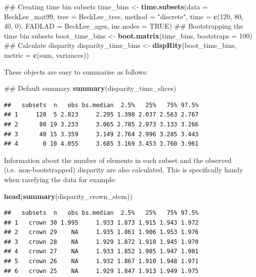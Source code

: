 \documentclass[]{book}
\newenvironment{Shaded}{\begin{snugshade}}{\end{snugshade}}
\newcommand{\KeywordTok}[1]{\textcolor[rgb]{0.13,0.29,0.53}{\textbf{#1}}}
\newcommand{\DataTypeTok}[1]{\textcolor[rgb]{0.13,0.29,0.53}{#1}}
\newcommand{\DecValTok}[1]{\textcolor[rgb]{0.00,0.00,0.81}{#1}}
\newcommand{\StringTok}[1]{\textcolor[rgb]{0.31,0.60,0.02}{#1}}
\newcommand{\OtherTok}[1]{\textcolor[rgb]{0.56,0.35,0.01}{#1}}
\newcommand{\NormalTok}[1]{#1}
\theoremstyle{definition}
\theoremstyle{definition}
\theoremstyle{remark}
\begin{document}
\begin{Shaded}
\begin{Highlighting}[]
\NormalTok{## Creating time bin subsets}
\NormalTok{time_bins <-}\StringTok{ }\KeywordTok{time.subsets}\NormalTok{(}\DataTypeTok{data =}\NormalTok{ BeckLee_mat99, }\DataTypeTok{tree =}\NormalTok{ BeckLee_tree, }
    \DataTypeTok{method =} \StringTok{"discrete"}\NormalTok{, }\DataTypeTok{time =} \KeywordTok{c}\NormalTok{(}\DecValTok{120}\NormalTok{, }\DecValTok{80}\NormalTok{, }\DecValTok{40}\NormalTok{, }\DecValTok{0}\NormalTok{), }\DataTypeTok{FADLAD =}\NormalTok{ BeckLee_ages,}
    \DataTypeTok{inc.nodes =} \OtherTok{TRUE}\NormalTok{)}
\NormalTok{## Bootstrapping the time bin subsets}
\NormalTok{boot_time_bins <-}\StringTok{ }\KeywordTok{boot.matrix}\NormalTok{(time_bins, }\DataTypeTok{bootstraps =} \DecValTok{100}\NormalTok{)}
\NormalTok{## Calculate disparity}
\NormalTok{disparity_time_bins <-}\StringTok{ }\KeywordTok{dispRity}\NormalTok{(boot_time_bins, }\DataTypeTok{metric =} \KeywordTok{c}\NormalTok{(sum, variances))}
\end{Highlighting}
\end{Shaded}

These objects are easy to summarise as follows:

\begin{Shaded}
\begin{Highlighting}[]
\NormalTok{## Default summary}
\KeywordTok{summary}\NormalTok{(disparity_time_slices)}
\end{Highlighting}
\end{Shaded}

\begin{verbatim}
##   subsets  n   obs bs.median  2.5%   25%   75% 97.5%
## 1     120  5 2.823     2.295 1.398 2.037 2.563 2.767
## 2      80 19 3.233     3.065 2.785 2.973 3.133 3.266
## 3      40 15 3.359     3.149 2.764 2.996 3.285 3.443
## 4       0 10 4.055     3.685 3.169 3.453 3.760 3.961
\end{verbatim}

Information about the number of elements in each subset and the observed
(i.e.~non-bootstrapped) disparity are also calculated. This is
specifically handy when rarefying the data for example:

\begin{Shaded}
\begin{Highlighting}[]
\KeywordTok{head}\NormalTok{(}\KeywordTok{summary}\NormalTok{(disparity_crown_stem))}
\end{Highlighting}
\end{Shaded}

\begin{verbatim}
##   subsets  n   obs bs.median  2.5%   25%   75% 97.5%
## 1   crown 30 1.995     1.933 1.873 1.915 1.943 1.972
## 2   crown 29    NA     1.935 1.861 1.906 1.953 1.976
## 3   crown 28    NA     1.929 1.872 1.910 1.945 1.970
## 4   crown 27    NA     1.933 1.852 1.905 1.947 1.981
## 5   crown 26    NA     1.932 1.867 1.910 1.948 1.971
## 6   crown 25    NA     1.929 1.847 1.913 1.949 1.975
\end{verbatim}
\end{document}
